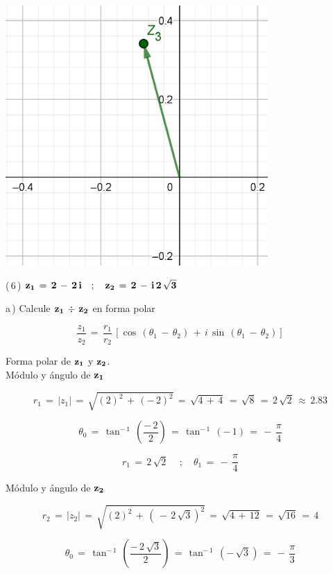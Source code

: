 \documentclass[a4paper,11pt,openany]{book}
\begin{document}
\begin{center}
    \includegraphics[width=10cm]{Gra-Ej-5-2.png}
\end{center}

\textcolor{ao(english)}{(\,6\,)} $\bf{z_{1}\,=\,2\,-\,2\,i \quad;\quad z_{2}\,=\,2\,-\,i\,2\,\sqrt{3}}$

\textcolor{ao(english)}{a\,)} Calcule $\bf{z_{1}\,\div\,z_{2}}$ en forma polar

$$\dfrac{z_{1}}{z_{2}}\,=\,\dfrac{r_{1}}{r_{2}}\,\left[\cos\,(\theta_{1}\,-\,\theta_{2})\,+\,i\,\sin\,(\theta_{1}\,-\,\theta_{2})\right]$$

\textcolor{ao(english)}{} Forma polar de $\bf{z_{1}}$ y $\bf{z_{2}}$.\\

\textcolor{ao(english)}{} Módulo y ángulo de $\bf{z_{1}}$ 

$$r_{1}\,=\,|z_{1}|\,=\,\sqrt{(2)^{2}\,+\,(-\,2)^{2}}\,=\,\sqrt{4\,+\,4}\,=\,\sqrt{8}\,=\,2\,\sqrt{2}\,\approx\,2.83$$

$$\theta_{0}\,=\,\tan^{-\,1}\,\left(\dfrac{-\,2}{2}\right)\,=\,\tan^{-\,1}\,(-\,1)\,=\,-\,\dfrac{\pi}{4}$$

$$\boxed{r_{1}\,=\,2\,\sqrt{2}\, \quad;\quad \theta_{1}\,=\,-\,\dfrac{\pi}{4}}$$

\textcolor{ao(english)}{} Módulo y ángulo de $\bf{z_{2}}$ 

$$r_{2}\,=\,|z_{2}|\,=\,\sqrt{(2)^{2}\,+\,(\,-\,2\,\sqrt{3})^{2}}\,=\,\sqrt{4\,+\,12}\,=\,\sqrt{16}\,=\,4$$

$$\theta_{0}\,=\,\tan^{-\,1}\,\left(\dfrac{-\,2\,\sqrt{3}}{2}\right)\,=\,\tan^{-\,1}\,(-\,\sqrt{3})\,=\,-\,\dfrac{\pi}{3}$$
\end{document}
